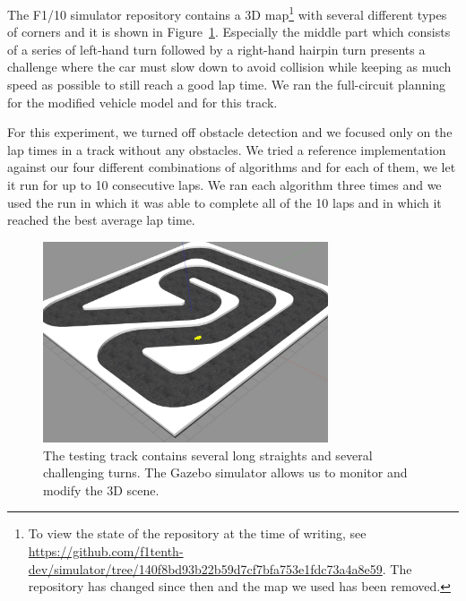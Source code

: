 The F1/10 simulator repository contains a 3D map\footnote{To view the state of the repository at the time of writing, see \url{https://github.com/f1tenth-dev/simulator/tree/140f8bd93b22b59d7cf7bfa753e1fdc73a4a8e59}. The repository has changed since then and the map we used has been removed.} with several different types of corners and it is shown in Figure~\ref{fig:gazebo-track}. Especially the middle part which consists of a series of left-hand turn followed by a right-hand hairpin turn presents a challenge where the car must slow down to avoid collision while keeping as much speed as possible to still reach a good lap time. We ran the full-circuit planning for the modified vehicle model and for this track.

For this experiment, we turned off obstacle detection and we focused only on the lap times in a track without any obstacles. We tried a reference implementation against our four different combinations of algorithms and for each of them, we let it run for up to 10 consecutive laps. We ran each algorithm three times and we used the run in which it was able to complete all of the 10 laps and in which it reached the best average lap time.

\begin{figure}
	\centering
	\includegraphics[width=0.75\textwidth]{../img/experiments/gazebo-track.png}
	\caption{The testing track contains several long straights and several challenging turns. The Gazebo simulator allows us to monitor and modify the 3D scene.}
	\label{fig:gazebo-track}
\end{figure}


